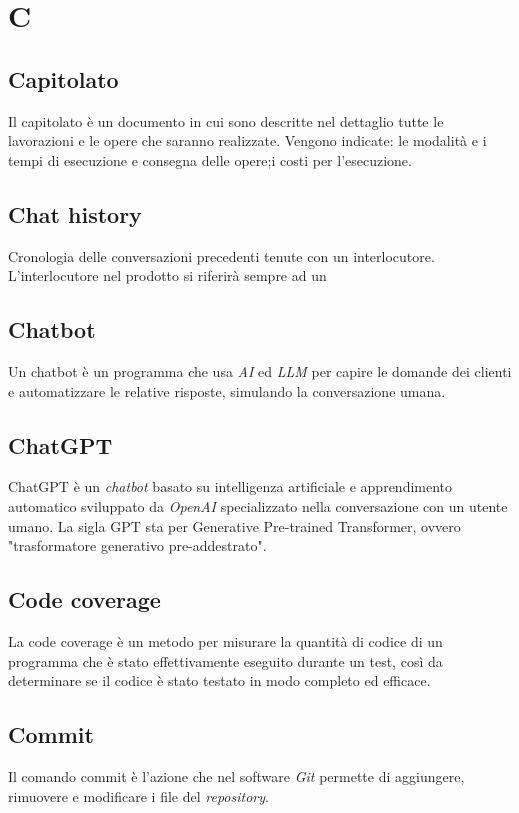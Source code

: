 \chapter{C}

\section{Capitolato}\label{sec:Capitolati}
Il capitolato è un documento in cui sono descritte nel dettaglio tutte le lavorazioni e le opere che saranno realizzate. Vengono indicate: le modalità e i tempi di esecuzione e consegna delle opere;i costi per l'esecuzione.

\section{Chat history}
Cronologia delle conversazioni precedenti tenute con un interlocutore. L'interlocutore nel prodotto si riferirà sempre ad un 

\section{Chatbot}
Un chatbot è un programma che usa \emph{AI} ed \emph{LLM} per capire le domande dei clienti e automatizzare le relative risposte, simulando la conversazione umana.

\section{ChatGPT}
ChatGPT è un \emph{chatbot} basato su intelligenza artificiale e apprendimento automatico sviluppato da \emph{OpenAI} specializzato nella conversazione con un utente umano. La sigla GPT sta per Generative Pre-trained Transformer, ovvero "trasformatore generativo pre-addestrato". 

\section{Code coverage}
La code coverage è un metodo per misurare la quantità di codice di un programma che è stato effettivamente eseguito durante un test, così da determinare se il codice è stato testato in modo completo ed efficace.

\section{Commit}\label{sec:Commits}
Il comando commit è l'azione che nel software \emph{Git} permette di aggiungere, rimuovere e modificare i file del \emph{repository}.

